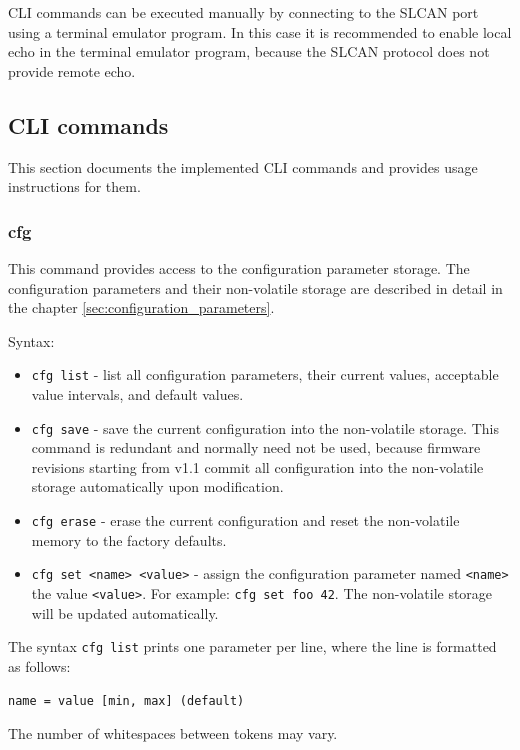 \documentclass{zubaxdoc}
\begin{document}
CLI commands can be executed manually by connecting to the SLCAN port using a terminal emulator program.
In this case it is recommended to enable local echo in the terminal emulator program,
because the SLCAN protocol does not provide remote echo.

\subsection{CLI commands}

This section documents the implemented CLI commands and provides usage instructions for them.

\subsubsection{cfg}

This command provides access to the configuration parameter storage.
The configuration parameters and their non-volatile storage are described in detail in the chapter
\ref{sec:configuration_parameters}.

Syntax:
\begin{itemize}
    \item \verb|cfg list| - list all configuration parameters, their current values,
          acceptable value intervals, and default values.

    \item \verb|cfg save| - save the current configuration into the non-volatile storage.
          This command is redundant and normally need not be used,
          because firmware revisions starting from v1.1 commit all configuration
          into the non-volatile storage automatically upon modification.

    \item \verb|cfg erase| - erase the current configuration and reset the non-volatile memory to
          the factory defaults.

    \item \verb|cfg set <name> <value>| - assign the configuration parameter named \verb|<name>| the value
          \verb|<value>|. For example: \verb|cfg set foo 42|.
          The non-volatile storage will be updated automatically.
\end{itemize}

The syntax \verb|cfg list| prints one parameter per line, where the line is formatted as follows:

\verb|name = value [min, max] (default)|

The number of whitespaces between tokens may vary.
\end{document}
